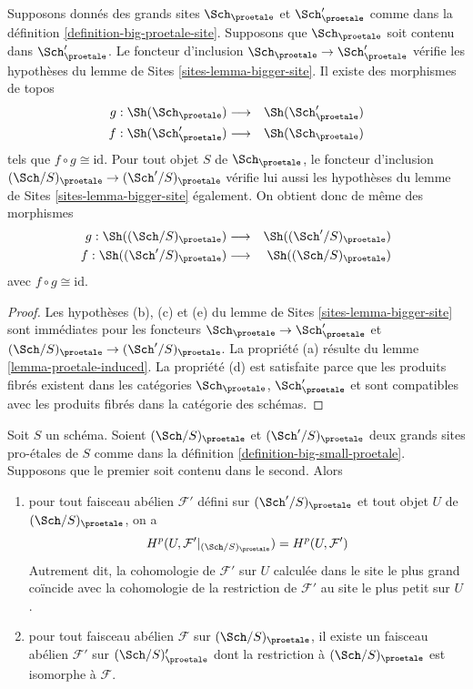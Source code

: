 \begin{lemma}
\label{lemma-change-alpha}
Supposons donnés des grands sites $\Sch_\proetale$ et $\Sch'_\proetale$ comme dans la
définition \ref{definition-big-proetale-site}.
Supposons que $\Sch_\proetale$ soit contenu dans $\Sch'_\proetale$.
Le foncteur d'inclusion $\Sch_\proetale \to \Sch'_\proetale$ vérifie
les hypothèses du lemme de Sites \ref{sites-lemma-bigger-site}.
Il existe des morphismes de topos
\begin{eqnarray*}
g : \Sh(\Sch_\proetale) &
\longrightarrow &
\Sh(\Sch'_\proetale) \\
f : \Sh(\Sch'_\proetale) &
\longrightarrow &
\Sh(\Sch_\proetale)
\end{eqnarray*}
tels que $f \circ g \cong \text{id}$. Pour tout objet $S$
de $\Sch_\proetale$, le foncteur d'inclusion
$(\Sch/S)_\proetale \to (\Sch'/S)_\proetale$ vérifie lui aussi
les hypothèses du lemme de Sites \ref{sites-lemma-bigger-site}
également. On obtient donc de même des morphismes
\begin{eqnarray*}
g : \Sh((\Sch/S)_\proetale) &
\longrightarrow &
\Sh((\Sch'/S)_\proetale) \\
f : \Sh((\Sch'/S)_\proetale) &
\longrightarrow &
\Sh((\Sch/S)_\proetale)
\end{eqnarray*}
avec $f \circ g \cong \text{id}$.
\end{lemma}

\begin{proof}
Les hypothèses (b), (c) et (e) du
lemme de Sites \ref{sites-lemma-bigger-site}
sont immédiates pour les foncteurs
$\Sch_\proetale \to \Sch'_\proetale$ et
$(\Sch/S)_\proetale \to (\Sch'/S)_\proetale$. La propriété (a) résulte du
lemme \ref{lemma-proetale-induced}.
La propriété (d) est satisfaite parce que
les produits fibrés existent dans les catégories $\Sch_\proetale$, $\Sch'_\proetale$
et sont compatibles avec les produits fibrés dans la catégorie des schémas.
\end{proof}

\begin{lemma}
\label{lemma-cohomology-enlarge-partial-universe}
Soit $S$ un schéma. Soient $(\Sch/S)_\proetale$ et $(\Sch'/S)_\proetale$ deux
grands sites pro-\'etales de $S$ comme dans la
définition \ref{definition-big-small-proetale}.
Supposons que le premier soit contenu dans
le second. Alors
\begin{enumerate}
\item pour tout faisceau abélien $\mathcal{F}'$ défini sur $(\Sch'/S)_\proetale$
et tout objet $U$ de $(\Sch/S)_\proetale$, on a
$$
H^p(U, \mathcal{F}'|_{(\Sch/S)_\proetale}) =
H^p(U, \mathcal{F}')
$$
Autrement dit, la cohomologie de $\mathcal{F}'$ sur $U$ calculée dans le site le plus grand
coïncide avec la cohomologie de la restriction de $\mathcal{F}'$ au site le plus petit
sur $U$.
\item pour tout faisceau abélien $\mathcal{F}$ sur $(\Sch/S)_\proetale$, il existe un
faisceau abélien $\mathcal{F}'$ sur $(\Sch/S)_\proetale'$ dont la restriction à
$(\Sch/S)_\proetale$ est isomorphe à $\mathcal{F}$.
\end{enumerate}
\end{lemma}

